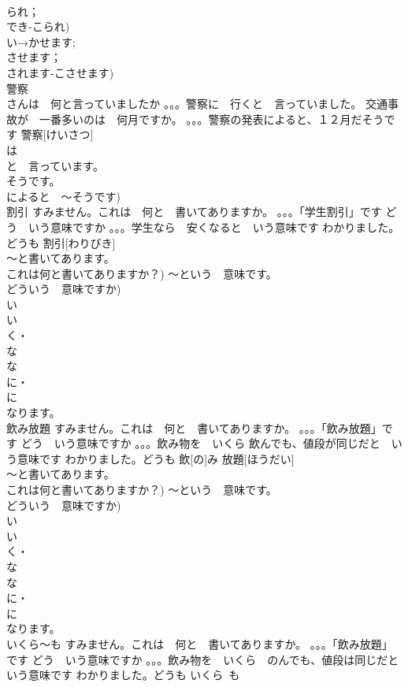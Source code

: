\documentclass[8pt]{extreport}
\begin{document}
\begin{CJK}{UTF8}{min}
\\	られ；
\\	でき-こられ) 
\\	い→かせます;
\\	させます；
\\	されます-こさせます)
\\	警察	
\\	さんは　何と言っていましたか 。。。警察に　行くと　言っていました。 交通事故が　一番多いのは　何月ですか。 。。。警察の発表によると、１２月だそうです	警察[けいさつ]			
\\	は
\\	と　言っています。
\\	そうです。
\\	によると　～そうです)	
\\	割引	すみません。これは　何と　書いてありますか。 。。。「学生割引」です どう　いう意味ですか 。。。学生なら　安くなると　いう意味です わかりました。どうも	割引[わりびき]			
\\	～と書いてあります。
\\	これは何と書いてありますか？) ～という　意味です。
\\	どういう　意味ですか) 
\\	い
\\	い
\\	く・
\\	な
\\	な
\\	に・
\\	に　
\\	なります。
\\	飲み放題	すみません。これは　何と　書いてありますか。 。。。「飲み放題」です どう　いう意味ですか 。。。飲み物を　いくら 飲んでも、値段が同じだと　いう意味です わかりました。どうも	飲[の]み 放題[ほうだい]			
\\	～と書いてあります。
\\	これは何と書いてありますか？) ～という　意味です。
\\	どういう　意味ですか) 
\\	い
\\	い
\\	く・
\\	な
\\	な
\\	に・
\\	に　
\\	なります。
\\	いくら～も	すみません。これは　何と　書いてありますか。 。。。「飲み放題」です どう　いう意味ですか 。。。飲み物を　いくら　のんでも、値段は同じだと　いう意味です わかりました。どうも	いくら~も			

\end{CJK}
\end{document}
